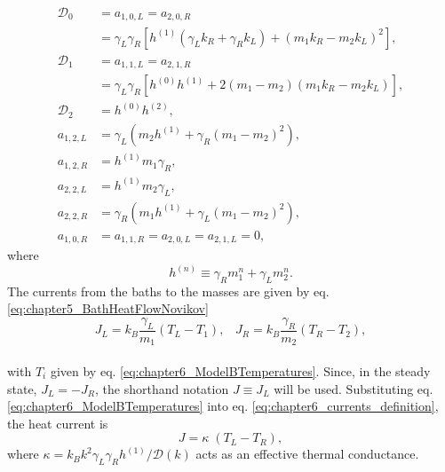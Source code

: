   \begin{align}
    \mathcal{D}_0 &= a_{1,0,L} = a_{2,0,R}
    \nonumber\\
    & = \gamma _L \gamma _R\! \left[h^{(1)}\! \left(\gamma_L k_R +\gamma_R k_L \right)+\left(m_1 k_R-m_2 k_L\right)^2\right]\!,
    \nonumber\\
    \mathcal{D}_1 &= a_{1,1,L} = a_{2,1,R}
    \nonumber\\
    &= \gamma _L \gamma _R\! \left[h^{(0)} h^{(1)}\!+2 \left(m_1-m_2\right) \left(m_1 k_R-m_2 k_L\right)\right]\!,
    \nonumber\\
    \mathcal{D}_2 &= h^{(0)} h^{(2)},\nonumber
    \\
    a_{1,2,L} &= \gamma _L \left(m_2 h^{(1)} + \gamma_R (m_1 - m_2)^2 \right),\nonumber
    \\
    a_{1,2,R} &= h^{(1)} m_1 \gamma_R,\nonumber
    \\
    a_{2,2,L} &= h^{(1)} m_2 \gamma_L,\nonumber
    \\
    a_{2,2,R} &= \gamma _R \left( m_1 h^{(1)} + \gamma_L (m_1-m_2)^2 \right),\nonumber
    \\
    a_{1,0,R} &= a_{1,1,R} = a_{2,0,L} = a_{2,1,L} = 0,
    \label{eq:chapter6_SolutionPolynomialCoefficients}
  \end{align}
%
where
%
\begin{equation}
h^{(n)}\equiv \gamma_R m_1^n + \gamma_L m_2^n.
\end{equation}
%
The currents from the baths to the masses are given by eq. \eqref{eq:chapter5_BathHeatFlowNovikov}
%
\begin{equation}
    J_L = k_B \frac{\gamma_L}{m_1} \left( T_L - T_1 \right),\;\;\;
    J_R = k_B \frac{\gamma_R}{m_2} \left( T_R - T_2 \right),
    \label{eq:chapter6_currents_definition}
\end{equation}
\\
%
with $T_i$ given by eq. \eqref{eq:chapter6_ModelBTemperatures}. Since, in the steady state, $J_L = -J_R$, the shorthand notation $J \equiv J_L$ will be used. Substituting eq. \eqref{eq:chapter6_ModelBTemperatures} into eq. \eqref{eq:chapter6_currents_definition}, the heat current is
%
\begin{equation}
  J = \kappa\;(T_L - T_R),
  \label{eq:chapter6_CurrentsInModelB}
\end{equation}
%
where $\kappa = k_B {k^2\gamma_L \gamma_R h^{(1)}}/{\mathcal{D}(k)}$ acts as an effective thermal conductance.
%
%
%
%

